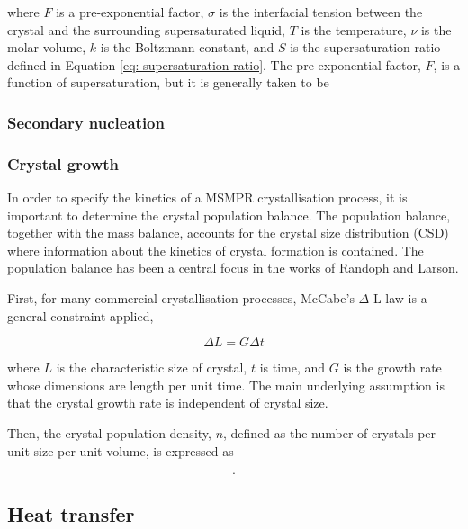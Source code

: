 \noindent where $F$ is a pre-exponential factor, $\sigma$ is the interfacial tension between the crystal and the surrounding supersaturated liquid, $T$ is the temperature, $\nu$ is the molar volume, $k$ is the Boltzmann constant, and $S$ is the supersaturation ratio defined in Equation \ref{eq: supersaturation ratio}. The pre-exponential factor, $F$, is a function of supersaturation, but it is generally taken to be



\subsubsection{Secondary nucleation}

\subsubsection{Crystal growth}

In order to specify the kinetics of a MSMPR crystallisation process, it is important to determine the crystal population balance. The population balance, together with the mass balance, accounts for the crystal size distribution (CSD) where information about the kinetics of crystal formation is contained. The population balance has been a central focus in the works of Randoph and Larson. \cite{randolph larson}

First, for many commercial crystallisation processes, McCabe's $\Delta$ L law is a general constraint applied,

\begin{equation} \label{eq: McCabe deltaL}
    \Delta L = G \Delta t
\end{equation}

\noindent where $L$ is the characteristic size of crystal, $t$ is time, and $G$ is the growth rate whose dimensions are length per unit time. The main underlying assumption is that the crystal growth rate is independent of crystal size. 

Then, the crystal population density, $n$, defined as the number of crystals per unit size per unit volume, is expressed as 

\begin{equation} \label{eq:crystal population density definition}
    .
\end{equation}






\subsection{Heat transfer}


